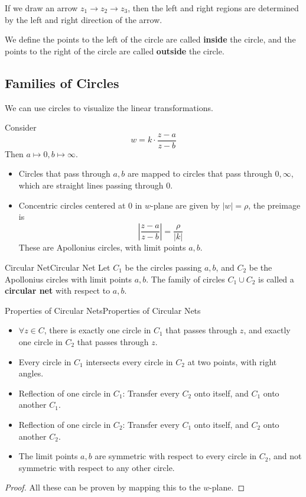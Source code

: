 \documentclass[../main.tex]{subfiles}
\begin{document}
\begin{remark}
If we draw an arrow $z_1 \rightarrow z_2 \rightarrow z_3$, then the left and right regions are determined by the left and right direction of the arrow.

We define the points to the left of the circle are called \textbf{inside} the circle, and the points to the right of the circle are called \textbf{outside} the circle.
\end{remark}

\subsection{Families of Circles}
We can use circles to visualize the linear transformations.

Consider
\begin{equation*}
w = k \cdot \frac{z-a}{z-b}
\end{equation*}
Then $a \mapsto 0, b \mapsto \infty $.
\begin{itemize}
\item Circles that pass through $a,b$ are mapped to circles that pass through $0,\infty $, which are straight lines passing through $0$.
\item Concentric circles centered at $0$ in $w$-plane are given by $\left|w\right| = \rho$, the preimage is
	\begin{equation*}
	\left|\frac{z-a}{z-b}\right| = \frac{\rho}{\left|k\right|}
	\end{equation*}
	These are Apollonius circles, with limit points $a,b$.
\end{itemize}

\begin{definition}{Circular Net}{Circular Net}
	Let $C_1$ be the circles passing $a,b$, and $C_2$ be the Apollonius circles with limit points $a,b$. The family of circles $C_1\cup C_2$ is called a \textbf{circular net} with respect to $a,b$.
\end{definition}

\begin{proposition}{Properties of Circular Nets}{Properties of Circular Nets}
\begin{itemize}
\item $\forall z\in C$, there is exactly one circle in $C_1$ that passes through $z$, and exactly one circle in $C_2$ that passes through $z$.
\item Every circle in $C_1$ intersects every circle in $C_2$ at two points, with right angles.
\item Reflection of one circle in $C_1$: Transfer every $C_2$ onto itself, and $C_1$ onto another $C_1$.
\item Reflection of one circle in $C_2$: Transfer every $C_1$ onto itself, and $C_2$ onto another $C_2$.
\item The limit points $a,b$ are symmetric with respect to every circle in $C_2$, and not symmetric with respect to any other circle.
\end{itemize}
\end{proposition}
\begin{proof}
All these can be proven by mapping this to the $w$-plane.
\end{proof}
\end{document}
